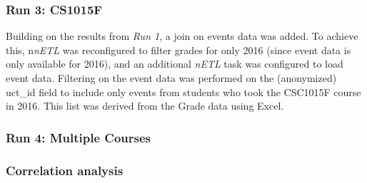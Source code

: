 \subsubsection{Run 3: CS1015F}
Building on the results from \textit{Run 1}, a join on events data was added. To achieve this, n\textit{nETL} was reconfigured to filter grades for only 2016 (since event data is only available for 2016), and an additional \textit{nETL} task was configured to load event data. Filtering on the event data was performed on the (anonymized) uct\_id field to include only events from students who took the CSC1015F course in 2016. This list was derived from the Grade data using Excel.


\subsubsection{Run 4: Multiple Courses}


\subsubsection{Correlation analysis}